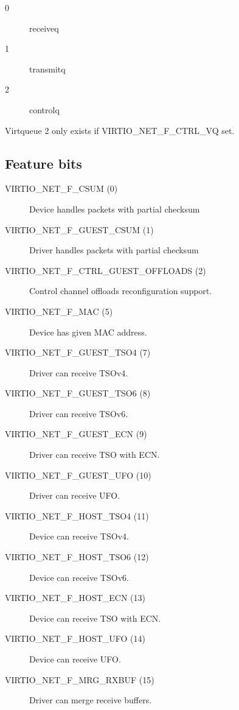 \begin{description}
\item[0] receiveq
\item[1] transmitq
\item[2] controlq
\end{description}

 Virtqueue 2 only exists if VIRTIO_NET_F_CTRL_VQ set.

\subsection{Feature bits}\label{sec:Device Types / Network Device / Feature bits}

\begin{description}
\item[VIRTIO_NET_F_CSUM (0)] Device handles packets with partial checksum

\item[VIRTIO_NET_F_GUEST_CSUM (1)] Driver handles packets with partial checksum

\item[VIRTIO_NET_F_CTRL_GUEST_OFFLOADS (2)] Control channel offloads
        reconfiguration support.

\item[VIRTIO_NET_F_MAC (5)] Device has given MAC address.

\item[VIRTIO_NET_F_GUEST_TSO4 (7)] Driver can receive TSOv4.

\item[VIRTIO_NET_F_GUEST_TSO6 (8)] Driver can receive TSOv6.

\item[VIRTIO_NET_F_GUEST_ECN (9)] Driver can receive TSO with ECN.

\item[VIRTIO_NET_F_GUEST_UFO (10)] Driver can receive UFO.

\item[VIRTIO_NET_F_HOST_TSO4 (11)] Device can receive TSOv4.

\item[VIRTIO_NET_F_HOST_TSO6 (12)] Device can receive TSOv6.

\item[VIRTIO_NET_F_HOST_ECN (13)] Device can receive TSO with ECN.

\item[VIRTIO_NET_F_HOST_UFO (14)] Device can receive UFO.

\item[VIRTIO_NET_F_MRG_RXBUF (15)] Driver can merge receive buffers.


\end{description}
